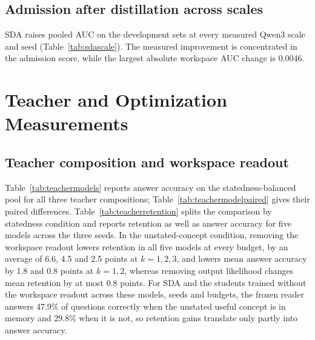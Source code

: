 \subsection{Admission after distillation across scales}
\label{app:sdascale}

SDA raises pooled AUC on the development sets at every measured Qwen3
scale and seed (Table~\ref{tab:sdascale}). The measured improvement is
concentrated in the admission score, while the largest absolute
workspace AUC change is 0.0046.



\FloatBarrier
\section{Teacher and Optimization Measurements}
\label{app:ablations}

\subsection{Teacher composition and workspace readout}

\label{app:teacherreadout}

Table~\ref{tab:teachermodels} reports answer accuracy on the
statedness-balanced pool for all three teacher compositions;
Table~\ref{tab:teachermodelpaired} gives their paired differences.
Table~\ref{tab:teacherretention} splits the comparison by statedness
condition and reports retention as well as answer accuracy for five
models across the three seeds.
In the unstated-concept condition, removing the workspace readout lowers
retention in all five models at every budget, by an average of 6.6, 4.5
and 2.5 points at $k=1,2,3$, and lowers mean answer accuracy by 1.8 and
0.8 points at $k=1,2$, whereas removing output likelihood changes mean
retention by at most 0.8 points.
For SDA and the students trained without the workspace readout across
these models, seeds and budgets, the frozen reader answers 47.9\% of
questions correctly when the unstated useful concept is in memory and
29.8\% when it is not, so retention gains translate only partly into
answer accuracy.







